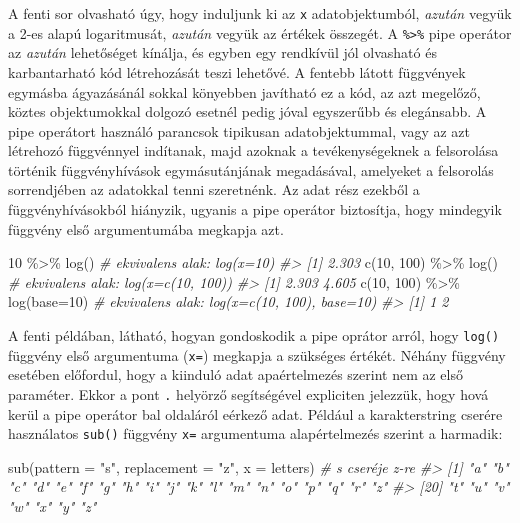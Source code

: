 \documentclass[
]{book}
\newenvironment{Shaded}{\begin{snugshade}}{\end{snugshade}}
\newcommand{\AttributeTok}[1]{\textcolor[rgb]{0.77,0.63,0.00}{#1}}
\newcommand{\CommentTok}[1]{\textcolor[rgb]{0.56,0.35,0.01}{\textit{#1}}}
\newcommand{\DecValTok}[1]{\textcolor[rgb]{0.00,0.00,0.81}{#1}}
\newcommand{\FunctionTok}[1]{\textcolor[rgb]{0.00,0.00,0.00}{#1}}
\newcommand{\NormalTok}[1]{#1}
\newcommand{\SpecialCharTok}[1]{\textcolor[rgb]{0.00,0.00,0.00}{#1}}
\newcommand{\StringTok}[1]{\textcolor[rgb]{0.31,0.60,0.02}{#1}}
\begin{document}
A fenti sor olvasható úgy, hogy induljunk ki az \texttt{x} adatobjektumból, \emph{azután} vegyük a 2-es alapú logaritmusát, \emph{azután} vegyük az értékek összegét. A \texttt{\%\textgreater{}\%} pipe operátor az \emph{azután} lehetőséget kínálja, és egyben egy rendkívül jól olvasható és karbantarható kód létrehozását teszi lehetővé. A fentebb látott függvények egymásba ágyazásánál sokkal könyebben javítható ez a kód, az azt megelőző, köztes objektumokkal dolgozó esetnél pedig jóval egyszerűbb és elegánsabb. A pipe operátort használó parancsok tipikusan adatobjektummal, vagy az azt létrehozó függvénnyel indítanak, majd azoknak a tevékenységeknek a felsorolása történik függvényhívások egymásutánjának megadásával, amelyeket a felsorolás sorrendjében az adatokkal tenni szeretnénk. Az adat rész ezekből a függvényhívásokból hiányzik, ugyanis a pipe operátor biztosítja, hogy mindegyik függvény első argumentumába megkapja azt.

\begin{Shaded}
\begin{Highlighting}[]
\DecValTok{10} \SpecialCharTok{\%\textgreater{}\%} \FunctionTok{log}\NormalTok{()                 }\CommentTok{\# ekvivalens alak: log(x=10)}
\CommentTok{\#\textgreater{} [1] 2.303}
\FunctionTok{c}\NormalTok{(}\DecValTok{10}\NormalTok{, }\DecValTok{100}\NormalTok{) }\SpecialCharTok{\%\textgreater{}\%} \FunctionTok{log}\NormalTok{()         }\CommentTok{\# ekvivalens alak: log(x=c(10, 100))}
\CommentTok{\#\textgreater{} [1] 2.303 4.605}
\FunctionTok{c}\NormalTok{(}\DecValTok{10}\NormalTok{, }\DecValTok{100}\NormalTok{) }\SpecialCharTok{\%\textgreater{}\%} \FunctionTok{log}\NormalTok{(}\AttributeTok{base=}\DecValTok{10}\NormalTok{)  }\CommentTok{\# ekvivalens alak: log(x=c(10, 100), base=10)}
\CommentTok{\#\textgreater{} [1] 1 2}
\end{Highlighting}
\end{Shaded}

A fenti példában, látható, hogyan gondoskodik a pipe oprátor arról, hogy \texttt{log()} függvény első argumentuma (\texttt{x=}) megkapja a szükséges értékét. Néhány függvény esetében előfordul, hogy a kiinduló adat apaértelmezés szerint nem az első paraméter. Ekkor a pont \texttt{.} helyörző segítségével expliciten jelezzük, hogy hová kerül a pipe operátor bal oldaláról eérkező adat. Például a karakterstring cserére használatos \texttt{sub()} függvény \texttt{x=} argumentuma alapértelmezés szerint a harmadik:

\begin{Shaded}
\begin{Highlighting}[]
\FunctionTok{sub}\NormalTok{(}\AttributeTok{pattern =} \StringTok{"s"}\NormalTok{, }\AttributeTok{replacement =} \StringTok{"z"}\NormalTok{, }\AttributeTok{x =}\NormalTok{ letters)  }\CommentTok{\# s cseréje z{-}re}
\CommentTok{\#\textgreater{}  [1] "a" "b" "c" "d" "e" "f" "g" "h" "i" "j" "k" "l" "m" "n" "o" "p" "q" "r" "z"}
\CommentTok{\#\textgreater{} [20] "t" "u" "v" "w" "x" "y" "z"}
\end{Highlighting}
\end{Shaded}
\end{document}
